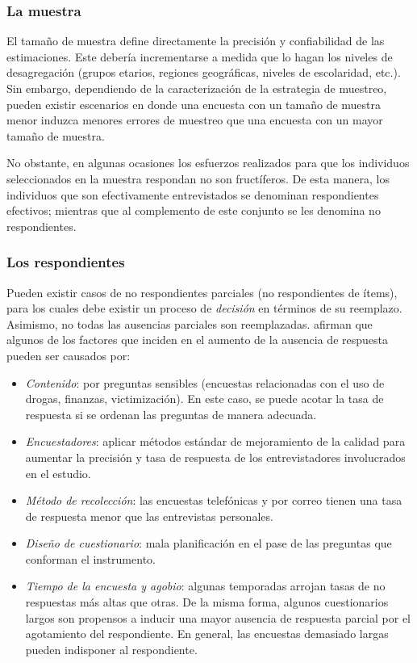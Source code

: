 \documentclass[
  12pt,
  spanish,
]{book}
\providecommand{\tightlist}{%
  \setlength{\itemsep}{0pt}\setlength{\parskip}{0pt}}
\begin{document}
\hypertarget{la-muestra}{%
\subsubsection*{La muestra}\label{la-muestra}}

El tamaño de muestra define directamente la precisión y confiabilidad de las estimaciones. Este debería incrementarse a medida que lo hagan los niveles de desagregación (grupos etarios, regiones geográficas, niveles de escolaridad, etc.). Sin embargo, dependiendo de la caracterización de la estrategia de muestreo, pueden existir escenarios en donde una encuesta con un tamaño de muestra menor induzca menores errores de muestreo que una encuesta con un mayor tamaño de muestra.

No obstante, en algunas ocasiones los esfuerzos realizados para que los individuos seleccionados en la muestra respondan no son fructíferos. De esta manera, los individuos que son efectivamente entrevistados se denominan respondientes efectivos; mientras que al complemento de este conjunto se les denomina no respondientes.

\hypertarget{los-respondientes}{%
\subsubsection*{Los respondientes}\label{los-respondientes}}

Pueden existir casos de no respondientes parciales (no respondientes de ítems), para los cuales debe existir un proceso de \emph{decisión} en términos de su reemplazo. Asimismo, no todas las ausencias parciales son reemplazadas. \citet{Groves_Fowler_Couper_Lepkowski_Singer_Tourangeau_2009} afirman que algunos de los factores que inciden en el aumento de la ausencia de respuesta pueden ser causados por:

\begin{itemize}
\tightlist
\item
  \emph{Contenido}: por preguntas sensibles (encuestas relacionadas con el uso de drogas, finanzas, victimización). En este caso, se puede acotar la tasa de respuesta si se ordenan las preguntas de manera adecuada.
\item
  \emph{Encuestadores}: aplicar métodos estándar de mejoramiento de la calidad para aumentar la precisión y tasa de respuesta de los entrevistadores involucrados en el estudio.
\item
  \emph{Método de recolección}: las encuestas telefónicas y por correo tienen una tasa de respuesta menor que las entrevistas personales.
\item
  \emph{Diseño de cuestionario}: mala planificación en el pase de las preguntas que conforman el instrumento.
\item
  \emph{Tiempo de la encuesta y agobio}: algunas temporadas arrojan tasas de no respuestas más altas que otras. De la misma forma, algunos cuestionarios largos son propensos a inducir una mayor ausencia de respuesta parcial por el agotamiento del respondiente. En general, las encuestas demasiado largas pueden indisponer al respondiente.
\end{itemize}
\end{document}
